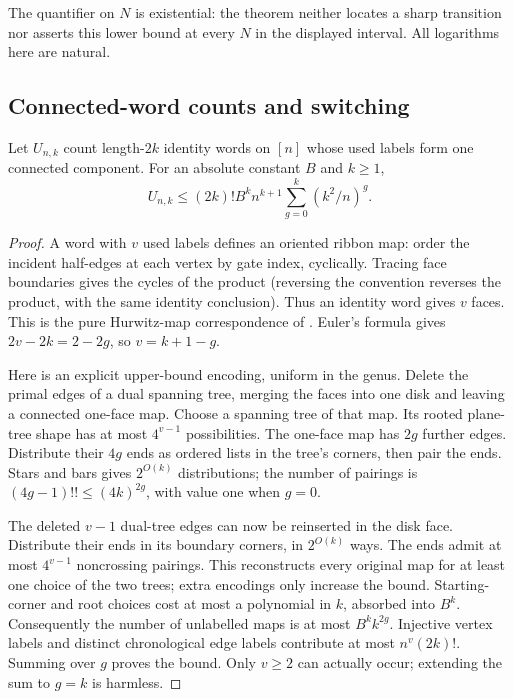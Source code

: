 The quantifier on $N$ is existential: the theorem neither locates a sharp
transition nor asserts this lower bound at every $N$ in the displayed
interval.  All logarithms here are natural.

\subsection{Connected-word counts and switching}

\begin{lemma}
\label{lem:connected-map-bound}
Let $U_{n,k}$ count length-$2k$ identity words on $[n]$ whose used labels
form one connected component.  For an absolute constant $B$ and $k\ge1$,
\[
 U_{n,k}\le(2k)!B^k n^{k+1}
                 \sum_{g=0}^k(k^2/n)^g.                 \tag{CB.1}
\]
\end{lemma}
\begin{proof}
A word with $v$ used labels defines an oriented ribbon map: order the
incident half-edges at each vertex by gate index, cyclically.  Tracing face
boundaries gives the cycles of the product (reversing the convention
reverses the product, with the same identity conclusion).  Thus an identity
word gives $v$ faces.  This is the pure Hurwitz-map correspondence of
\cite[Definition 1.3 and equation (10)]{CLW2024}.  Euler's formula gives
$2v-2k=2-2g$, so $v=k+1-g$.

Here is an explicit upper-bound encoding, uniform in the genus.  Delete the
primal edges of a dual spanning tree, merging the faces into one disk and
leaving a connected one-face map.  Choose a spanning tree of that map.
Its rooted plane-tree shape has at most $4^{v-1}$ possibilities.  The
one-face map has $2g$ further edges.  Distribute their $4g$ ends as ordered
lists in the tree's corners, then pair the ends.  Stars and bars gives
$2^{O(k)}$ distributions; the number of pairings is
$(4g-1)!!\le(4k)^{2g}$, with value one when $g=0$.

The deleted $v-1$ dual-tree edges can now be reinserted in the disk face.
Distribute their ends in its boundary corners, in $2^{O(k)}$ ways.  The
ends admit at most $4^{v-1}$ noncrossing pairings.  This reconstructs every
original map for at least one choice of the two trees; extra encodings
only increase the bound.  Starting-corner and root choices cost at most a
polynomial in $k$, absorbed into $B^k$.  Consequently the number of
unlabelled maps is at most $B^k k^{2g}$.  Injective vertex labels and
distinct chronological edge labels contribute at most $n^v(2k)!$.
Summing over $g$ proves the bound.  Only $v\ge2$ can actually occur;
extending the sum to $g=k$ is harmless.
\end{proof}

